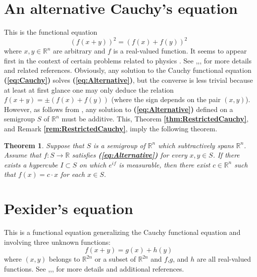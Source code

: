 \documentclass[12 pt]{amsart}
\newtheorem{thm}{Theorem}[section]
\theoremstyle{definition}
\newcommand{\R}{\mathbb{R}}
\newcommand{\bref}[1]{\textbf{\ref{#1}}} %
\newcommand{\beqref}[1]{\textbf{(\ref{#1})}} %
\begin{document}
\section{An alternative Cauchy's equation}\label{sec:Alternative}
This is the functional equation
\begin{equation}\label{eq:Alternative}
(f(x+y))^2=(f(x)+f(y))^2 
\end{equation}
where $x,y\in\R^n$ are arbitrary and $f$ is a real-valued function. 
It seems to appear first in the context of certain problems related to physics \cite{Hosszu1964}. 
See  \cite{FischerMuszely1967},\cite{Hosszu1963},\cite{Kuczma1978},\cite[pp. 380--382]{Kuczma2009book} 
for more details and related references. 
Obviously, any solution to the Cauchy functional equation \beqref{eq:Cauchy} 
solves \beqref{eq:Alternative}, but the converse is less trivial 
because at least at first glance one may only deduce the relation 
 $f(x+y)=\pm(f(x)+f(y))$ (where the sign depends on the pair $(x,y)$). However, as follows from  \cite[Theorem 13.9.2, p. 382]{Kuczma2009book},  
 any solution to  \beqref{eq:Alternative} defined on a semigroup $S$ of $\R^n$ must be additive. 
This, Theorem \bref{thm:RestrictedCauchy}, and Remark \bref{rem:RestrictedCauchy}, 
imply the following theorem.
\begin{thm}
Suppose that $S$ is a semigroup of $\R^n$ which subtractively spans $\R^n$. Assume that 
$f:S\to\R$ satisfies \beqref{eq:Alternative} for every $x,y\in S$. If there exists a hypercube $I\subset S$ on which 
$e^{if}$ is measurable, then there exist $c\in\R^n$ 
such that $f(x)=c\cdot x$ for each $x\in S$. 
\end{thm}
 

\section{Pexider's equation}\label{sec:Pexider}
This is a functional equation generalizing the Cauchy functional equation and 
involving three unknown functions:
\begin{equation}\label{eq:Pexider}
f(x+y)=g(x)+h(y) 
\end{equation}
where $(x,y)$ belongs to  $\R^{2n}$ or a subset of $\R^{2n}$ and $f$,$g$, and $h$ are all real-valued functions. 
See \cite[pp. 141--142]{Aczel},\cite[pp. 42--43]{AczelDhombres},\cite[pp. 355--363]{Kuczma2009book},\cite{Pexider1903}
for more details and additional references. 
\end{document}
